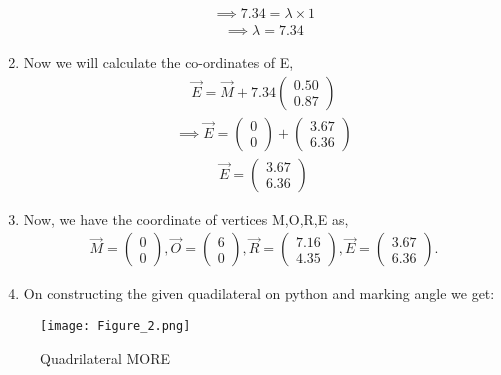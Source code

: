 \documentclass[journal,12pt,twocolumn]{IEEEtran}
\newcommand{\myvec}[1]{\ensuremath{\begin{pmatrix}#1\end{pmatrix}}}
\begin{document}
\begin{enumerate}
\begin{align}
   \implies 7.34= \lambda \times 1
\end{align}
\begin{align}
    \implies \lambda = 7.34
\end{align}
\item Now we will calculate the co-ordinates of E,
\begin{align}
 \vec{E}= \vec{M}+ 7.34\myvec{0.50\\0.87}
 \end{align}
 \begin{align}
     \implies \vec{E}= \myvec{0\\0}+\myvec{3.67\\6.36}
 \end{align}
 \begin{align}
     \vec{E}= \myvec{3.67\\6.36}
 \end{align}
 \item Now, we have the coordinate of vertices M,O,R,E as,
\begin{align}
\vec{M}= \myvec{0 \\ 0}, \vec{O}= \myvec{6 \\ 0},  \vec{R}= \myvec{7.16 \\ 4.35}, \vec{E}= \myvec{3.67 \\ 6.36}.
\end{align}    
    \item On constructing the given quadilateral on python and marking angle we get:
\end{enumerate}
\begin{figure}[!ht]
\texttt{[image: Figure\_2.png]}
\caption{Quadrilateral MORE}
\label{fig:Quadrilateral MORE}	
\end{figure}
\end{document}
